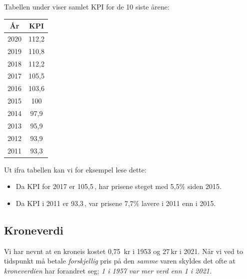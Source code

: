 Tabellen under viser samlet KPI for de 10 siste årene:
\begin{center}
	\begin{tabular}{c|c}
		År &  KPI \\ \hline
		2020 & 112,2\\
		2019 & 	110,8\\
		2018 &  112,2 \\
		2017&	105,5\\
		2016&	103,6\\
		2015&	100\\
		2014&	97,9\\
		2013&	95,9\\
		2012&	93,9\\
		2011&	93,3\\
	\end{tabular}
\end{center}
Ut ifra tabellen kan vi for eksempel lese dette:
\begin{itemize}
	\item Da KPI for 2017 er 105,5\,, har prisene steget med 5,5\% siden 2015.
	\item Da KPI i 2011 er 93,3\,, var prisene 7,7\% lavere i 2011 enn i 2015.
\end{itemize}
\newpage
{}
\subsection{Kroneverdi}
Vi har nevnt at en kroneis kostet 0,75 \,kr i 1953 og 27\,kr i 2021. Når vi ved to tidspunkt må betale \textsl{forskjellig} pris på den \textsl{samme} varen skyldes det ofte at \textit{kroneverdien} har forandret seg;\textsl{ 1 i 1957 var mer verd  enn 1 i 2021.
}\vsk


